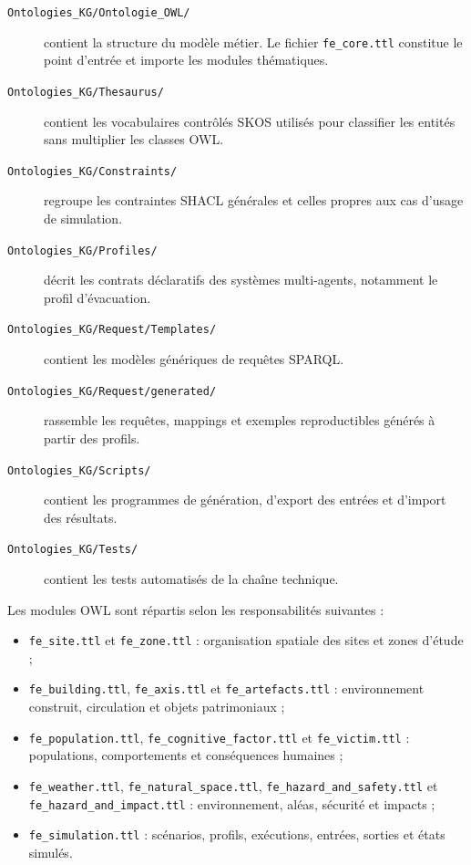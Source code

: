 \documentclass{article}
\begin{document}
\begin{description}
    \item[\texttt{Ontologies\_KG/Ontologie\_OWL/}] contient la structure du modèle métier. Le fichier \texttt{fe\_core.ttl} constitue le point d'entrée et importe les modules thématiques.
    \item[\texttt{Ontologies\_KG/Thesaurus/}] contient les vocabulaires contrôlés SKOS utilisés pour classifier les entités sans multiplier les classes OWL.
    \item[\texttt{Ontologies\_KG/Constraints/}] regroupe les contraintes SHACL générales et celles propres aux cas d'usage de simulation.
    \item[\texttt{Ontologies\_KG/Profiles/}] décrit les contrats déclaratifs des systèmes multi-agents, notamment le profil d'évacuation.
    \item[\texttt{Ontologies\_KG/Request/Templates/}] contient les modèles génériques de requêtes SPARQL.
    \item[\texttt{Ontologies\_KG/Request/generated/}] rassemble les requêtes, mappings et exemples reproductibles générés à partir des profils.
    \item[\texttt{Ontologies\_KG/Scripts/}] contient les programmes de génération, d'export des entrées et d'import des résultats.
    \item[\texttt{Ontologies\_KG/Tests/}] contient les tests automatisés de la chaîne technique.
\end{description}

Les modules OWL sont répartis selon les responsabilités suivantes :

\begin{itemize}
    \item \texttt{fe\_site.ttl} et \texttt{fe\_zone.ttl} : organisation spatiale des sites et zones d'étude ;
    \item \texttt{fe\_building.ttl}, \texttt{fe\_axis.ttl} et \texttt{fe\_artefacts.ttl} : environnement construit, circulation et objets patrimoniaux ;
    \item \texttt{fe\_population.ttl}, \texttt{fe\_cognitive\_factor.ttl} et \texttt{fe\_victim.ttl} : populations, comportements et conséquences humaines ;
    \item \texttt{fe\_weather.ttl}, \texttt{fe\_natural\_space.ttl}, \texttt{fe\_hazard\_and\_safety.ttl} et \texttt{fe\_hazard\_and\_impact.ttl} : environnement, aléas, sécurité et impacts ;
    \item \texttt{fe\_simulation.ttl} : scénarios, profils, exécutions, entrées, sorties et états simulés.
\end{itemize}
\end{document}
